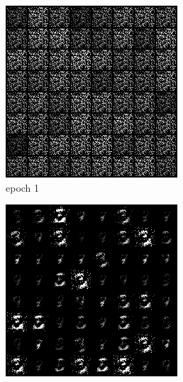 \documentclass[a4paper]{article}
\theoremstyle{definition}
\newenvironment{soln}{
	\leavevmode\color{blue}\ignorespaces
}{}
\begin{document}
\begin{enumerate} [label=(\alph*)]
\begin{soln}
			\begin{figure}[H]
				\centering
				\begin{subfigure}[b]{0.3\textwidth}
					\centering
					\includegraphics[width=\textwidth]{1c_e1.png}
					\caption{epoch 1}
				\end{subfigure}
				\hfill
				\begin{subfigure}[b]{0.3\textwidth}
					\centering
					\includegraphics[width=\textwidth]{1c_e25.png}

\end{subfigure}
\end{figure}
\end{soln}
\end{enumerate}
\end{document}
